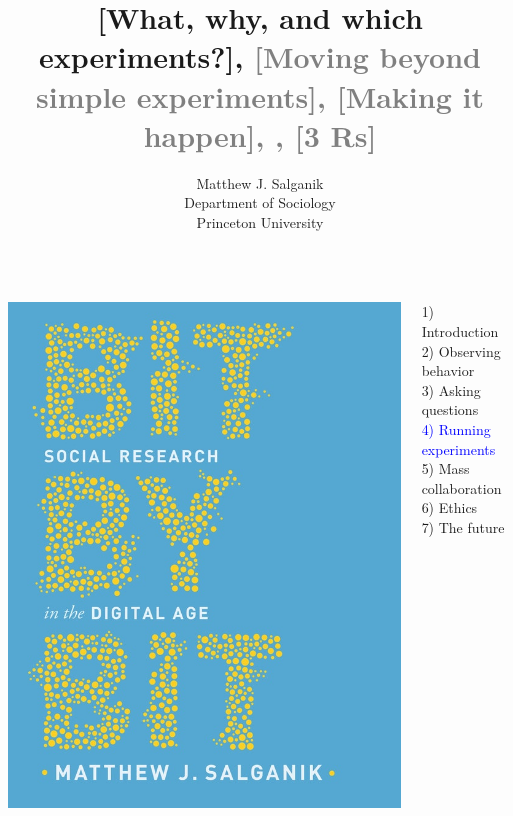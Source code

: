 \documentclass[aspectratio=169]{beamer}
\title[]{[What, why, and which experiments?], \newline \textcolor{gray}{[Moving beyond simple experiments], [Making it happen], \newline [Zero variable cost data and MusicLab], [3 Rs]}}
\author[]{Matthew J. Salganik\\Department of Sociology\\Princeton University}
\date[]{
\begin{flushright}
\texttt{[image: figures/cc-by.png]}
\end{flushright}
}
\begin{document}
\frame{\titlepage}
\begin{frame}

\begin{columns}
\begin{column}{.40\textwidth}
\includegraphics[width=\textwidth]{figures/salganik_bit_2018_cover}
\end{column}%

\hfill%

\begin{column}{.60\textwidth}
1) Introduction \\
2) Observing behavior \\
3) Asking questions \\
\textcolor{blue}{4) Running experiments} \\
5) Mass collaboration \\
6) Ethics \\
7) The future \\
\end{column}%
\end{columns}

\end{frame}
\end{document}
